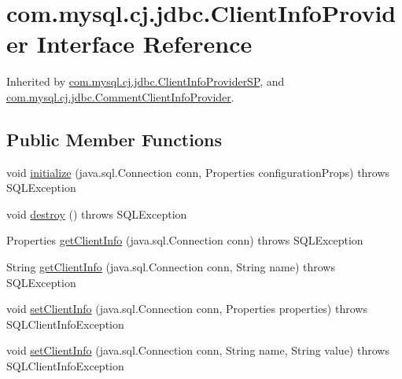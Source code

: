 \hypertarget{interfacecom_1_1mysql_1_1cj_1_1jdbc_1_1_client_info_provider}{}\section{com.\+mysql.\+cj.\+jdbc.\+Client\+Info\+Provider Interface Reference}
\label{interfacecom_1_1mysql_1_1cj_1_1jdbc_1_1_client_info_provider}


Inherited by \mbox{\hyperlink{classcom_1_1mysql_1_1cj_1_1jdbc_1_1_client_info_provider_s_p}{com.\+mysql.\+cj.\+jdbc.\+Client\+Info\+Provider\+SP}}, and \mbox{\hyperlink{classcom_1_1mysql_1_1cj_1_1jdbc_1_1_comment_client_info_provider}{com.\+mysql.\+cj.\+jdbc.\+Comment\+Client\+Info\+Provider}}.

\subsection*{Public Member Functions}
\begin{DoxyCompactItemize}
\item 
void \mbox{\hyperlink{interfacecom_1_1mysql_1_1cj_1_1jdbc_1_1_client_info_provider_aacf1104fd90e2c5b1ca940d63e884cf6}{initialize}} (java.\+sql.\+Connection conn, Properties configuration\+Props)  throws S\+Q\+L\+Exception
\item 
void \mbox{\hyperlink{interfacecom_1_1mysql_1_1cj_1_1jdbc_1_1_client_info_provider_a994581557bab4982ec5699fa1114ef5a}{destroy}} ()  throws S\+Q\+L\+Exception
\item 
Properties \mbox{\hyperlink{interfacecom_1_1mysql_1_1cj_1_1jdbc_1_1_client_info_provider_ac0bf93f0436618158753cb1f7ce7b463}{get\+Client\+Info}} (java.\+sql.\+Connection conn)  throws S\+Q\+L\+Exception
\item 
String \mbox{\hyperlink{interfacecom_1_1mysql_1_1cj_1_1jdbc_1_1_client_info_provider_a0447982e2a9eeec5776288384f7db3c1}{get\+Client\+Info}} (java.\+sql.\+Connection conn, String name)  throws S\+Q\+L\+Exception
\item 
void \mbox{\hyperlink{interfacecom_1_1mysql_1_1cj_1_1jdbc_1_1_client_info_provider_aa6e19d37534651d9916fb45ea7392044}{set\+Client\+Info}} (java.\+sql.\+Connection conn, Properties properties)  throws S\+Q\+L\+Client\+Info\+Exception
\item 
void \mbox{\hyperlink{interfacecom_1_1mysql_1_1cj_1_1jdbc_1_1_client_info_provider_a441ebd918daad38ab349ba676b75e8bd}{set\+Client\+Info}} (java.\+sql.\+Connection conn, String name, String value)  throws S\+Q\+L\+Client\+Info\+Exception
\end{DoxyCompactItemize}


